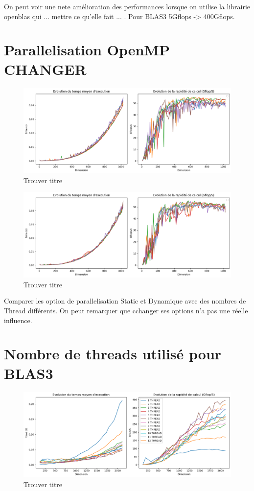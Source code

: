 \documentclass{report}
\begin{document}
On peut voir une nete amélioration des performances lorsque on utilise la librairie openblas qui ... mettre ce qu'elle fait ... .
Pour BLAS3 5Gflops -> 400Gflops.

\chapter{Parallelisation OpenMP CHANGER}

\begin{figure}[H]
    \centering
    \includegraphics[width=0.7\linewidth]{images/fig4.png}
    \caption{Trouver titre}
    \label{fig:4}
\end{figure}

\begin{figure}[H]
    \centering
    \includegraphics[width=0.7\linewidth]{images/fig5.png}
    \caption{Trouver titre}
    \label{fig:5}
\end{figure}

Comparer les option de parallelisation Static et Dynamique avec des nombres de Thread différents. On peut remarquer que cchanger ses options n'a pas une réelle influence.

\chapter{Nombre de threads utilisé pour BLAS3}
\begin{figure}[H]
    \centering
    \includegraphics[width=0.7\linewidth]{images/fig6.png}
    \caption{Trouver titre}
    \label{fig:6}
\end{figure}
\end{document}
